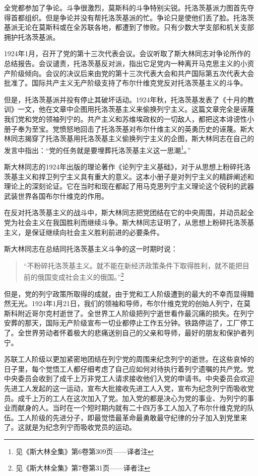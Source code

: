 全党都参加了争论。斗争很激烈，莫斯科的斗争特别尖锐。托洛茨基派力图首先夺得首都组织。但是争论并没有帮托洛茨基派的忙。争论只是使他们丢了脸。托洛茨基派无论在莫斯科或在全苏联各地，都遭到了惨败。只有少数大学支部和机关支部拥护托洛茨基派。

1924年1月，召开了党的第十三次代表会议。会议听取了斯大林同志对争论所作的总结报告。会议谴责，托洛茨基反对派，指出它足党内一种离开马克思主义的小资产阶级倾向。会议的决议后来由党的第十三次代表大会和共产国际第五次代表大会批准了。国际共产主义无产阶级支持了布尔什维克党反对托洛茨基主义的斗争。

但是，托洛茨基派并投有停止其破坏话动。1924年秋，托洛茨基发表了《十月的教训》一文，他在文章中企图用托洛茨基主义来偷换列宁主义。这篇文章完全是诬蔑我们党和党的领袖列宁的。共产主义和苏维埃政权的一切敌人，都把这本诽谤性小册子奉为至宝。党愤怒地回击了托洛茨基对布尔什维主义的英勇历史的诬蔑。斯大林同志揭穿了托洛茨基用托洛茨基主义偷换列宁主义的企图，斯大林同志在自己的发言中指出：“党的任务就是要埋葬托洛茨基主义这一思潮\footnote{见《斯大林全集》第6卷第309页——译者注}。”

斯大林同志的1924年出版的理论著作《论列宁主义基础》，对于从思想上粉碎托洛茨基主义和捍卫列宁主义具有重大的意义。这本小册子是对列宁主义的精辟阐述和理论上的深刻论证。它在当时和现在都起了用马克思列宁主义理论这个锐利的武器武装世界各国布尔什维克的作用。

在反对托洛茨基主义的战斗中，斯大林同志把党团结在它的中央周围，并动员起全党为社会主义在我国胜利而继续斗争。斯大林同志证明了，从思想上粉碎托洛茨基主义，是保证继续向社会主义胜利前进的必要条件。

斯大林同志在总结同托洛茨基主义斗争的这一时期时说：

\begin{quotation}
“不粉碎托洛茨基主义。就不能在新经济政策条件下取得胜利，就不能把目前的俄国变成社会主义的俄国。”\footnote{见《斯大林全集》第7卷第31页——译者注}
\end{quotation}

但是，党的列宁政策所取得的成就，由于党和工人阶级遭到的最大的不幸而显得黯然无光。1924年1月21日，我们的领袖和导师，布尔什维克党的创始人列宁，在莫斯科附近哥尔克村逝世了。全世界工人阶级把列宁逝世看作最沉痛的损失。在列宁安葬的那天，国际无产阶级宣布一切业都停止工作五分钟。铁路停运了，工厂停工了。全世界劳动者怀着极大的悲痛送别自己的父亲和导师，最好的朋友和保护者列宁。

苏联工人阶级以更加紧密地团结在列宁党的周围来纪念列宁的逝世。在这些哀悼的日子里，每个觉悟工人都仔细考虑了自己应如何对待执行着列宁遗嘱的共产党。党中央委员会收到了成千上万非党工人请求接收他们入党的申请书。中央委员会欢迎先进工人发起的这一运动，宣布大批接收先进工人入党，宣布为纪念列宁而吸收党员。成千上万的工人在这次加入了党。加入党的都是决心为党的事业、为列宁的事业而献身的人。当时在一个短时期内就有二十四万多工人加入了布尔什维克党的队伍。工人阶级的先进分子，即最觉悟最革命最勇敢最守纪律的分子加入到党里来了。这就是为纪念列宁而吸收党员的运动。

